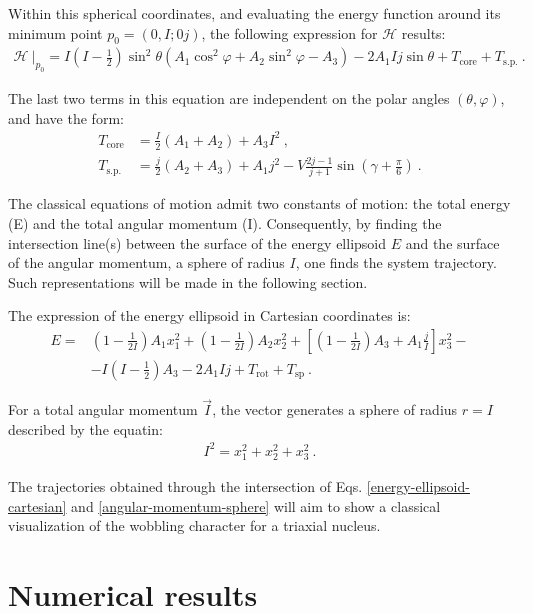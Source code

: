 \documentclass[11pt]{article}
\begin{document}
Within this spherical coordinates, and evaluating the energy function around its minimum point $p_0=(0,I;0j)$, the following expression for $\mathcal{H}$ results:
\begin{align}
    \left. \mathcal{H}\ \right\vert_{p_0}=I\left(I-\frac{1}{2}\right)\sin^2\theta(A_1\cos^2\varphi+A_2\sin^2\varphi-A_3)-2A_1Ij\sin\theta+T_\text{core}+T_\text{s.p.}\ .
    \label{energy-function-minimal}
\end{align}

The last two terms in this equation are independent on the polar angles $(\theta,\varphi)$, and  have the form:
\begin{align}
    T_\text{core}&=\frac{I}{2}(A_1+A_2)+A_3I^2\ ,\nonumber \\
    T_\text{s.p.}&=\frac{j}{2}(A_2+A_3)+A_1j^2-V\frac{2j-1}{j+1}\sin\left(\gamma+\frac{\pi}{6}\right)\ .
    \label{energyfunction-core-single-particle-subterms}
\end{align}

The classical equations of motion admit two constants of motion: the total energy (E) and the total angular momentum (I).  Consequently, by finding the intersection line(s) between the surface of the energy ellipsoid $E$ and the surface of the angular momentum, a sphere of radius  $I$, one finds the system trajectory.  Such representations will be made in the following section.

The expression of the energy ellipsoid in Cartesian coordinates is:
\begin{align}
    E=&\left(1-\frac{1}{2I}\right)A_1x_1^2+\left(1-\frac{1}{2I}\right)A_2x_2^2+\left[\left(1-\frac{1}{2I}\right)A_3+A_1\frac{j}{I}\right]x_3^2-\nonumber\\
    &-I\left(I-\frac{1}{2}\right)A_3-2A_1Ij+T_\text{rot}+T_\text{sp}\ .
    \label{energy-ellipsoid-cartesian}
\end{align}

 For a total angular momentum $\vec{I}$, the vector generates a sphere of radius $r=I$ described by the equatin:
\begin{align}
    I^2=x_1^2+x_2^2+x_3^2\ .
    \label{angular-momentum-sphere}
\end{align}

The trajectories obtained through the intersection of Eqs. \ref{energy-ellipsoid-cartesian} and \ref{angular-momentum-sphere} will aim to show a classical visualization of the wobbling character for a triaxial nucleus.

\section{Numerical results}
\end{document}
